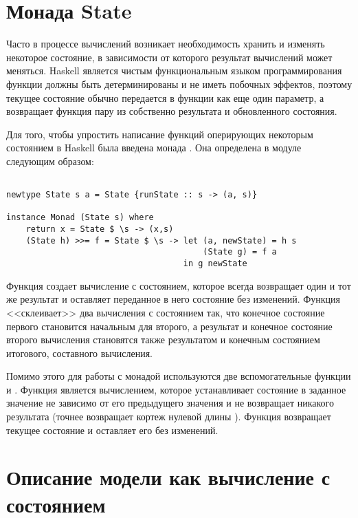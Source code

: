 \section{Монада State}

Часто в процессе вычислений возникает необходимость хранить и изменять некоторое состояние, в зависимости от которого результат вычислений может меняться. Haskell является чистым функциональным языком программирования функции должны быть детерминированы и не иметь побочных эффектов, поэтому текущее состояние обычно передается в функции как еще один параметр, а возвращает функция пару из собственно результата и обновленного состояния.

Для того, чтобы упростить написание функций оперирующих некоторым состоянием в Haskell была введена монада . Она определена в модуле  следующим образом:

\begin{verbatim}

newtype State s a = State {runState :: s -> (a, s)}

instance Monad (State s) where
    return x = State $ \s -> (x,s)
    (State h) >>= f = State $ \s -> let (a, newState) = h s
                                        (State g) = f a
                                    in g newState

\end{verbatim}

Функция  создает вычисление с состоянием, которое всегда возвращает один и тот же результат и оставляет переданное в него состояние без изменений. Функция \Code{$>>=$} <<склеивает>> два вычисления с состоянием так, что конечное  состояние первого становится начальным для второго, а результат и конечное состояние второго вычисления становятся также результатом и конечным состоянием итогового, составного вычисления.

Помимо этого для работы с монадой  используются две вспомогательные функции  и . Функция  является вычислением, которое устанавливает состояние в заданное значение не зависимо от его предыдущего значения и не возвращает никакого результата (точнее возвращает кортеж нулевой длины \Code{()}). Функция  возвращает текущее состояние и оставляет его без изменений. 

\section{Описание модели как вычисление с состоянием}

